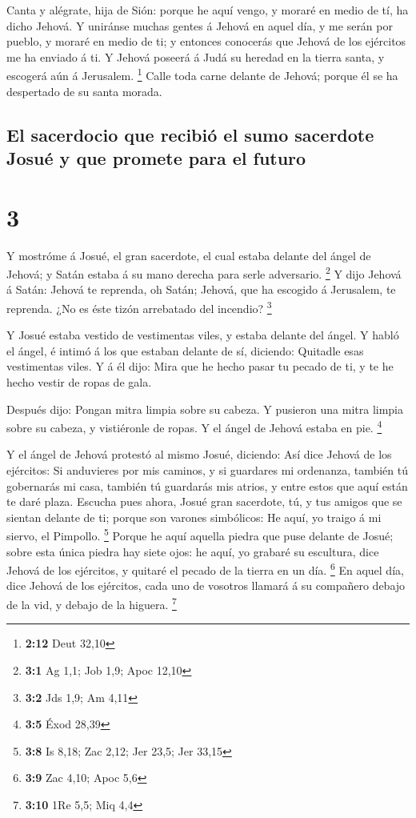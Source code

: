  Canta y alégrate, hija de Sión: porque he aquí vengo, y
moraré en medio de tí, ha dicho Jehová.  Y uniránse muchas
gentes á Jehová en aquel día, y me serán por pueblo, y moraré en medio
de ti; y entonces conocerás que Jehová de los ejércitos me ha enviado á
ti.  Y Jehová poseerá á Judá su heredad en la tierra santa,
y escogerá aún á Jerusalem. \footnote{\textbf{2:12} Deut 32,10}
 Calle toda carne delante de Jehová; porque él se ha
despertado de su santa morada.

\hypertarget{el-sacerdocio-que-recibiuxf3-el-sumo-sacerdote-josuuxe9-y-que-promete-para-el-futuro}{%
\subsection{El sacerdocio que recibió el sumo sacerdote Josué y que
promete para el
futuro}\label{el-sacerdocio-que-recibiuxf3-el-sumo-sacerdote-josuuxe9-y-que-promete-para-el-futuro}}

\hypertarget{section-2}{%
\section{3}\label{section-2}}

 Y mostróme á Josué, el gran sacerdote, el cual estaba
delante del ángel de Jehová; y Satán estaba á su mano derecha para serle
adversario. \footnote{\textbf{3:1} Ag 1,1; Job 1,9; Apoc 12,10}
 Y dijo Jehová á Satán: Jehová te reprenda, oh Satán;
Jehová, que ha escogido á Jerusalem, te reprenda. ¿No es éste tizón
arrebatado del incendio? \footnote{\textbf{3:2} Jds 1,9; Am 4,11}

 Y Josué estaba vestido de vestimentas viles, y estaba
delante del ángel.  Y habló el ángel, é intimó á los que
estaban delante de sí, diciendo: Quitadle esas vestimentas viles. Y á él
dijo: Mira que he hecho pasar tu pecado de ti, y te he hecho vestir de
ropas de gala.

 Después dijo: Pongan mitra limpia sobre su cabeza. Y
pusieron una mitra limpia sobre su cabeza, y vistiéronle de ropas. Y el
ángel de Jehová estaba en pie. \footnote{\textbf{3:5} Éxod 28,39}

 Y el ángel de Jehová protestó al mismo Josué, diciendo:
 Así dice Jehová de los ejércitos: Si anduvieres por mis
caminos, y si guardares mi ordenanza, también tú gobernarás mi casa,
también tú guardarás mis atrios, y entre estos que aquí están te daré
plaza.  Escucha pues ahora, Josué gran sacerdote, tú, y tus
amigos que se sientan delante de ti; porque son varones simbólicos: He
aquí, yo traigo á mi siervo, el Pimpollo. \footnote{\textbf{3:8} Is
  8,18; Zac 2,12; Jer 23,5; Jer 33,15}  Porque he aquí
aquella piedra que puse delante de Josué; sobre esta única piedra hay
siete ojos: he aquí, yo grabaré su escultura, dice Jehová de los
ejércitos, y quitaré el pecado de la tierra en un día. \footnote{\textbf{3:9}
  Zac 4,10; Apoc 5,6}  En aquel día, dice Jehová de los
ejércitos, cada uno de vosotros llamará á su compañero debajo de la vid,
y debajo de la higuera. \footnote{\textbf{3:10} 1Re 5,5; Miq 4,4}

